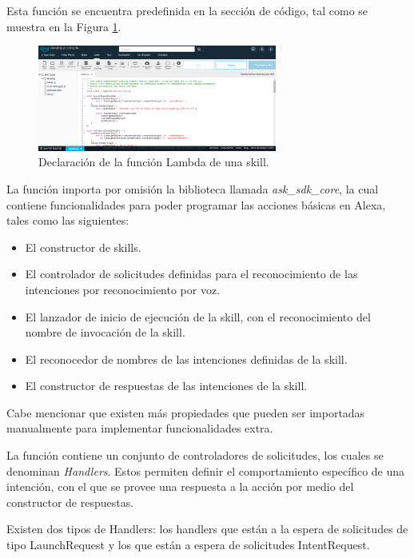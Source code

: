 Esta función se encuentra predefinida en la sección de código, tal como se muestra en la Figura \ref{fig:411}.

\begin{figure}[H]
  \centering
  \includegraphics[width=0.70\textwidth]{Cap4/Figuras/Funcionlambda.png}
  \caption{Declaración de la función Lambda de una skill.}
  \label{fig:411}
\end{figure}

La función importa por omisión la biblioteca llamada \textit{ask\_sdk\_core}, la cual contiene funcionalidades para poder programar las acciones básicas en Alexa, tales como las siguientes:

\begin{itemize}
  \item El constructor de skills.
  \item El controlador de solicitudes definidas para el reconocimiento de las intenciones por reconocimiento por voz.
  \item El lanzador de inicio de ejecución de la skill, con el reconocimiento del nombre de invocación de la skill.
  \item El reconocedor de nombres de las intenciones definidas de la skill.
  \item El constructor de respuestas de las intenciones de la skill.
\end{itemize}

Cabe mencionar que existen más propiedades que pueden ser importadas manualmente para implementar funcionalidades extra.

La función contiene un conjunto de controladores de solicitudes, los cuales se denominan \textit{Handlers}. Estos permiten definir el comportamiento específico de una intención, con el que se provee una respuesta a la acción por medio del constructor de respuestas.

Existen dos tipos de Handlers: los handlers que están a la espera de solicitudes de tipo LaunchRequest y los que están a espera de solicitudes IntentRequest.

